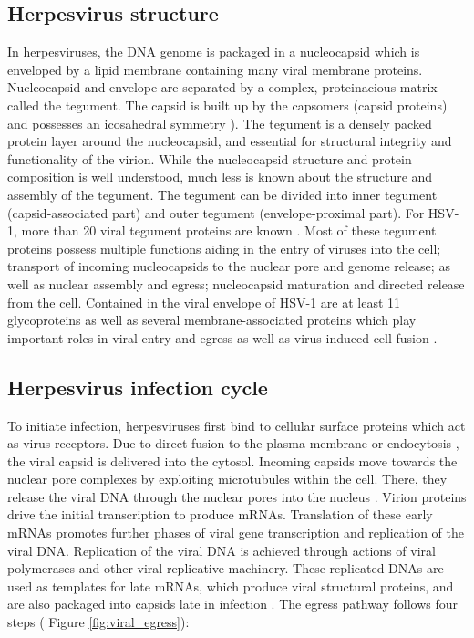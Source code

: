\subsection{Herpesvirus structure}
In herpesviruses, the DNA genome is packaged in a nucleocapsid which is enveloped by a lipid membrane containing many viral membrane proteins.
Nucleocapsid and envelope are separated by a complex, proteinacious matrix called the tegument.
The capsid is built up by the capsomers (capsid proteins) and possesses an icosahedral symmetry \cite{[4]}).
The tegument is a densely packed protein layer around the nucleocapsid, and essential for structural integrity and functionality of the virion.
While the nucleocapsid structure and protein composition is well understood, much less is known about the structure and assembly of the tegument.
The tegument can be divided into inner tegument (capsid-associated part) and outer tegument (envelope-proximal part).
For HSV-1, more than 20 viral tegument proteins are known \cite{[5, 6]}.
Most of these tegument proteins possess multiple functions aiding in the entry of viruses into the cell; transport of incoming nucleocapsids to the nuclear pore and genome release; as well as nuclear assembly and egress; nucleocapsid maturation and directed release from the cell.
Contained in the viral envelope of HSV-1 are at least 11 glycoproteins as well as several membrane-associated proteins which play important roles in viral entry and egress as well as virus-induced cell fusion \cite{[2, 7]}.

\subsection{Herpesvirus infection cycle}
To initiate infection, herpesviruses first bind to cellular surface proteins which act as virus receptors.
Due to direct fusion to the plasma membrane or endocytosis \cite{[8]}, the viral capsid is delivered into the cytosol.
Incoming capsids move towards the nuclear pore complexes by exploiting microtubules within the cell\cite{[9, 10]}.
There, they release the viral DNA through the nuclear pores into the nucleus \cite{[11]}.
Virion proteins drive the initial transcription to produce %
mRNAs.
Translation of these early mRNAs promotes further phases of viral gene transcription and replication of the viral DNA.
Replication of the viral DNA is achieved through actions of viral polymerases and other viral replicative machinery.
These replicated DNAs are used as templates for late mRNAs, which produce viral structural proteins, and are also packaged into capsids late in infection \cite{[4]}.
The egress pathway follows four steps (%
Figure \ref{fig:viral_egress}):

